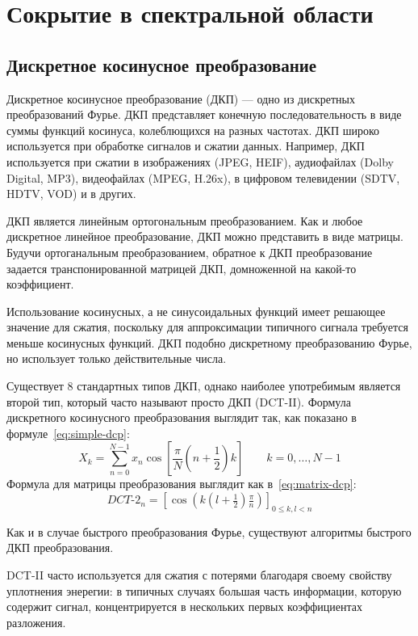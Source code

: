 \chapter{Сокрытие в спектральной области}
\section{Дискретное косинусное преобразование}
Дискретное косинусное преобразование (ДКП) --- одно из дискретных преобразований Фурье.
ДКП представляет конечную последовательность в виде суммы функций косинуса,
колеблющихся на разных частотах. ДКП широко используется при обработке сигналов и сжатии данных.
Например, ДКП используется при сжатии в изображениях (JPEG, HEIF), аудиофайлах (Dolby Digital, MP3),
видеофайлах (MPEG, H.26x), в цифровом телевидении (SDTV, HDTV, VOD) и в других.

ДКП является линейным ортогональным преобразованием. Как и любое дискретное линейное преобразование,
ДКП можно представить в виде матрицы. Будучи ортоганальным преобразованием, обратное к ДКП преобразование
задается транспонированной матрицей ДКП, домноженной на какой-то коэффициент.

Использование косинусных, а не синусоидальных функций имеет решающее значение для сжатия,
поскольку для аппроксимации типичного сигнала требуется меньше косинусных функций.
ДКП подобно дискретному преобразованию Фурье, но использует только действительные числа.

Существует 8 стандартных типов ДКП, однако наиболее употребимым является второй тип,
который часто называют просто ДКП (DCT-II).
Формула дискретного косинусного преобразования выглядит так,
как показано в формуле~\ref{eq:simple-dcp}:
\begin{equation} \label{eq:simple-dcp}
    X_k = \sum_{n=0}^{N-1} x_n \cos \left[\frac{\pi}{N} \left(n+\frac{1}{2}\right) k \right] \quad \quad k = 0, \dots, N-1    
\end{equation}
Формула для матрицы преобразования выглядит как в~\ref{eq:matrix-dcp}:
\begin{equation} \label{eq:matrix-dcp}
    {DCT}\text{-}2_n= \left[\cos (k(l+\tfrac{1}{2})\tfrac{\pi}{n})\right]_{0\leq k,l<n}    
\end{equation}

Как и в случае быстрого преобразования Фурье, существуют алгоритмы быстрого ДКП преобразования.

DCT-II часто используется для сжатия с потерями благодаря своему свойству уплотнения энерегии:
в типичных случаях большая часть информации, которую содержит сигнал, концентрируется в нескольких
первых коэффициентах разложения.

